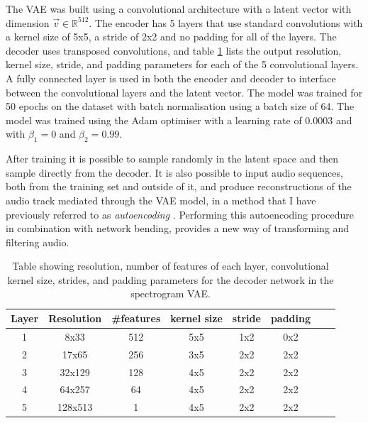 The VAE was built using a convolutional architecture with a latent vector with dimension $\vec{v} \in \mathbb{R}^{512}$. The encoder has 5 layers that use standard convolutions with a kernel size of 5x5, a stride of 2x2 and no padding for all of the layers. The decoder uses transposed convolutions, and table \ref{tab:c5:decoder-architecture} lists the output resolution, kernel size, stride, and padding parameters for each of the 5 convolutional layers. A fully connected layer is used in both the encoder and decoder to interface between the convolutional layers and the latent vector. The model was trained for 50 epochs on the dataset with batch normalisation using a batch size of 64. The model was trained using the Adam optimiser \citep{kingma2014adam} with a learning rate of 0.0003 and with $\beta_1 = 0$ and $\beta_2 = 0.99$.

After training it is possible to sample randomly in the latent space and then sample directly from the decoder. It is also possible to input audio sequences, both from the training set and outside of it, and produce reconstructions of the audio track mediated through the VAE model, in a method that I have previously referred to as \textit{autoencoding} \citep{broad2017autoencoding}. Performing this autoencoding procedure in combination with network bending, provides a new way of transforming and filtering audio.

\begin{table}[]
    \centering
    \begin{tabular}{|c|c|c|c|c|c|c|c|}
    \hline
    Layer & Resolution & \#features & kernel size & stride & padding \\
    \hline
    1     & 8x33       & 512        & 5x5         & 1x2     & 0x2  \\
    2     & 17x65      & 256        & 3x5         & 2x2     & 2x2 \\
    3     & 32x129     & 128        & 4x5         & 2x2     & 2x2 \\
    4     & 64x257     & 64         & 4x5         & 2x2     & 2x2  \\
    5     & 128x513    & 1          & 4x5         & 2x2     & 2x2  \\
    \hline
    \end{tabular}
    \medskip
    \caption{\label{tab:c5:decoder-architecture}Table showing resolution, number of features of each layer, convolutional kernel size, strides, and padding parameters for the decoder network in the spectrogram VAE.}
    
    \end{table}

